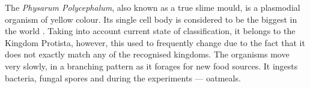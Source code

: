 The \textit{Physarum Polycephalum}, also known as a true slime mould, is a plasmodial organism of yellow colour. Its single cell body is considered to be the biggest in the world \cite{stephenson1994myxomycetes}. Taking into account current state of classification, it belongs to the Kingdom Protista, however, this used to frequently change due to the fact that it does not exactly match any of the recognised kingdoms. The organisms move very slowly, in a branching pattern as it forages for new food sources. It ingests bacteria, fungal spores and during the experiments --- oatmeals.









